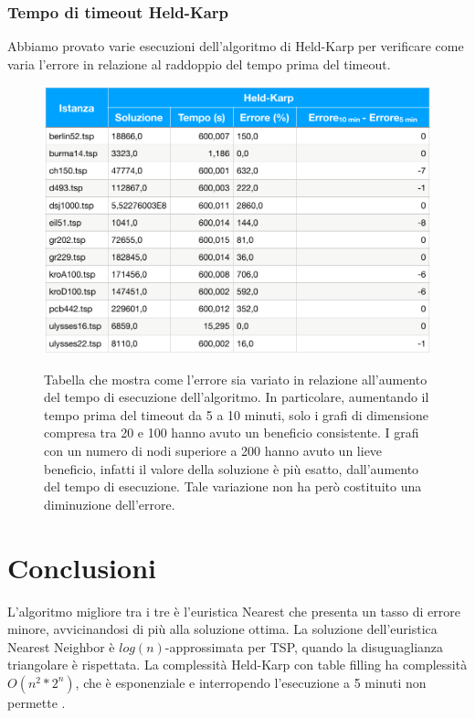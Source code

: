\documentclass[a4paper]{article}
\begin{document}
\subsubsection{Tempo di timeout Held-Karp}
Abbiamo provato varie esecuzioni dell'algoritmo di Held-Karp per verificare come varia l'errore in relazione al raddoppio del tempo prima del timeout.
\begin{figure}[H]
	\centering
	\includegraphics[width=0.5\linewidth]{differenze_errori}
	\label{fig:timeouttiming}
	\caption{Tabella che mostra come l'errore sia variato in relazione all'aumento del tempo di esecuzione dell'algoritmo. In particolare, aumentando il tempo prima del timeout da 5 a 10 minuti, solo i grafi di dimensione compresa tra 20 e 100 hanno avuto un beneficio consistente. I grafi con un numero di nodi superiore a 200 hanno avuto un lieve beneficio, infatti il valore della soluzione è più esatto, dall'aumento del tempo di esecuzione. Tale variazione non ha però costituito una diminuzione dell'errore.}
\end{figure}

\section{Conclusioni}
L'algoritmo migliore tra i tre è l'euristica Nearest che presenta un tasso di errore minore, avvicinandosi di più alla soluzione ottima. La soluzione dell'euristica Nearest Neighbor è $log(n)$-approssimata per TSP, quando la disuguaglianza triangolare è rispettata. La complessità Held-Karp con table filling ha complessità $O(n^2*2^n)$, che è esponenziale e interropendo l'esecuzione a 5 minuti non permette .
\end{document}
